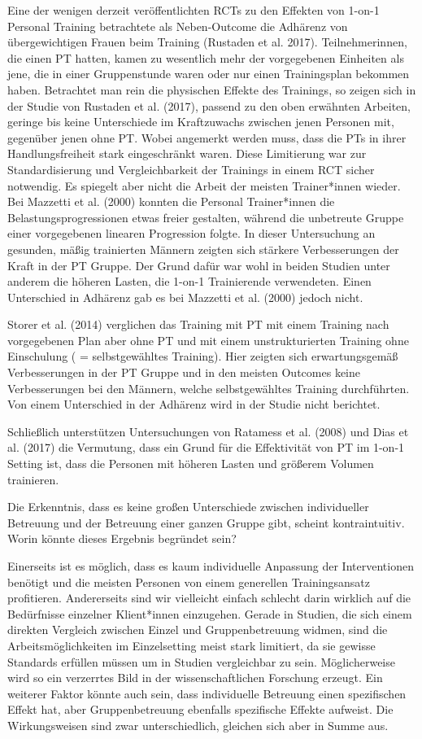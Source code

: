 \documentclass[
  letterpaper,
  DIV=11,
  numbers=noendperiod]{scrreprt}
\begin{document}
Eine der wenigen derzeit veröffentlichten RCTs zu den Effekten von
1-on-1 Personal Training betrachtete als Neben-Outcome die Adhärenz von
übergewichtigen Frauen beim Training (Rustaden et al. 2017).
Teilnehmerinnen, die einen PT hatten, kamen zu wesentlich mehr der
vorgegebenen Einheiten als jene, die in einer Gruppenstunde waren oder
nur einen Trainingsplan bekommen haben. Betrachtet man rein die
physischen Effekte des Trainings, so zeigen sich in der Studie von
Rustaden et al. (2017), passend zu den oben erwähnten Arbeiten, geringe
bis keine Unterschiede im Kraftzuwachs zwischen jenen Personen mit,
gegenüber jenen ohne PT. Wobei angemerkt werden muss, dass die PTs in
ihrer Handlungsfreiheit stark eingeschränkt waren. Diese Limitierung war
zur Standardisierung und Vergleichbarkeit der Trainings in einem RCT
sicher notwendig. Es spiegelt aber nicht die Arbeit der meisten
Trainer*innen wieder. Bei Mazzetti et al. (2000) konnten die Personal
Trainer*innen die Belastungsprogressionen etwas freier gestalten,
während die unbetreute Gruppe einer vorgegebenen linearen Progression
folgte. In dieser Untersuchung an gesunden, mäßig trainierten Männern
zeigten sich stärkere Verbesserungen der Kraft in der PT Gruppe. Der
Grund dafür war wohl in beiden Studien unter anderem die höheren Lasten,
die 1-on-1 Trainierende verwendeten. Einen Unterschied in Adhärenz gab
es bei Mazzetti et al. (2000) jedoch nicht.

Storer et al. (2014) verglichen das Training mit PT mit einem Training
nach vorgegebenen Plan aber ohne PT und mit einem unstrukturierten
Training ohne Einschulung ( = selbstgewähltes Training). Hier zeigten
sich erwartungsgemäß Verbesserungen in der PT Gruppe und in den meisten
Outcomes keine Verbesserungen bei den Männern, welche selbstgewähltes
Training durchführten. Von einem Unterschied in der Adhärenz wird in der
Studie nicht berichtet.

Schließlich unterstützen Untersuchungen von Ratamess et al. (2008) und
Dias et al. (2017) die Vermutung, dass ein Grund für die Effektivität
von PT im 1-on-1 Setting ist, dass die Personen mit höheren Lasten und
größerem Volumen trainieren.

Die Erkenntnis, dass es keine großen Unterschiede zwischen individueller
Betreuung und der Betreuung einer ganzen Gruppe gibt, scheint
kontraintuitiv. Worin könnte dieses Ergebnis begründet sein?

Einerseits ist es möglich, dass es kaum individuelle Anpassung der
Interventionen benötigt und die meisten Personen von einem generellen
Trainingsansatz profitieren. Andererseits sind wir vielleicht einfach
schlecht darin wirklich auf die Bedürfnisse einzelner Klient*innen
einzugehen. Gerade in Studien, die sich einem direkten Vergleich
zwischen Einzel und Gruppenbetreuung widmen, sind die
Arbeitsmöglichkeiten im Einzelsetting meist stark limitiert, da sie
gewisse Standards erfüllen müssen um in Studien vergleichbar zu sein.
Möglicherweise wird so ein verzerrtes Bild in der wissenschaftlichen
Forschung erzeugt. Ein weiterer Faktor könnte auch sein, dass
individuelle Betreuung einen spezifischen Effekt hat, aber
Gruppenbetreuung ebenfalls spezifische Effekte aufweist. Die
Wirkungsweisen sind zwar unterschiedlich, gleichen sich aber in Summe
aus.
\end{document}
